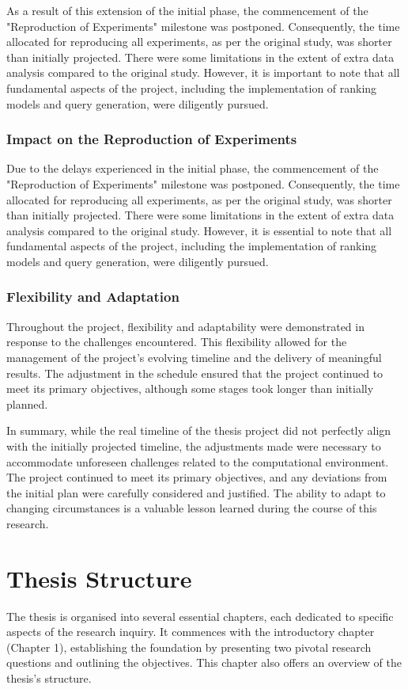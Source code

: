 As a result of this extension of the initial phase, the commencement of the "Reproduction of Experiments" milestone was postponed. Consequently, the time allocated for reproducing all experiments, as per the original study, was shorter than initially projected. There were some limitations in the extent of extra data analysis compared to the original study. However, it is important to note that all fundamental aspects of the project, including the implementation of ranking models and query generation, were diligently pursued.

\subsubsection{Impact on the Reproduction of Experiments}
Due to the delays experienced in the initial phase, the commencement of the "Reproduction of Experiments" milestone was postponed. Consequently, the time allocated for reproducing all experiments, as per the original study, was shorter than initially projected. There were some limitations in the extent of extra data analysis compared to the original study. However, it is essential to note that all fundamental aspects of the project, including the implementation of ranking models and query generation, were diligently pursued.

\subsubsection{Flexibility and Adaptation}
Throughout the project, flexibility and adaptability were demonstrated in response to the challenges encountered. This flexibility allowed for the management of the project's evolving timeline and the delivery of meaningful results. The adjustment in the schedule ensured that the project continued to meet its primary objectives, although some stages took longer than initially planned.

In summary, while the real timeline of the thesis project did not perfectly align with the initially projected timeline, the adjustments made were necessary to accommodate unforeseen challenges related to the computational environment. The project continued to meet its primary objectives, and any deviations from the initial plan were carefully considered and justified. The ability to adapt to changing circumstances is a valuable lesson learned during the course of this research.

\section{Thesis Structure}
The thesis is organised into several essential chapters, each dedicated to specific aspects of the research inquiry. It commences with the introductory chapter (Chapter 1), establishing the foundation by presenting two pivotal research questions and outlining the objectives. This chapter also offers an overview of the thesis's structure.

